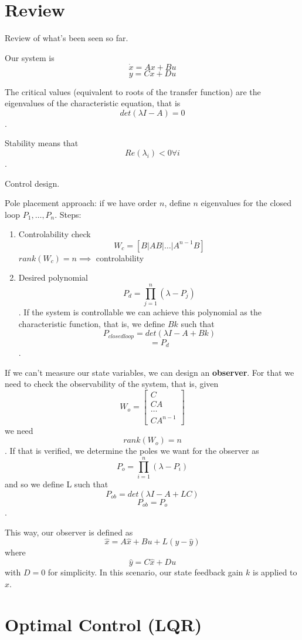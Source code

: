 
\section*{Review}

Review of what's been seen so far.

Our system is
\[
    \dot{x} = Ax + Bu
\] \[
y = Cx + Du
\] 

The critical values (equivalent to roots of the transfer function) are the eigenvalues of the characteristic equation, that is \[
    det(\lambda I-A) = 0
\] .

Stability means that \[
    Re(\lambda_i)<0 \forall i
\] .

Control design.

Pole placement approach: if we have order $n$, define $n$ eigenvalues for the closed loop $P_1, \ldots, P_n$. Steps:
\begin{enumerate}
    \item Controlability check \[
    W_c = \left[ B | AB | \ldots | A^{n-1}B \right] 
\] $rank(W_c) = n \implies $ controlability
    \item Desired polynomial \[
	    P_d = \prod_{j=1}^{n} (\lambda-P_j) 
    \] . If the system is controllable we can achieve this polynomial as the characteristic function, that is, we define $B k$ such that \[
    P_{closed loop} = det(\lambda I - A + B k)
    \] \[
    = P_d
    \] .
\end{enumerate}

If we can't measure our state variables, we can design an \textbf{observer}. For that we need to check the observability of the system, that is, given \[
    W_o = \begin{bmatrix} C \\ CA \\ \ldots \\ CA^{n-1}\end{bmatrix} 
\] we need \[
rank(W_o) = n
\] . If that is verified, we determine the poles we want for the observer as \[
P_o = \prod_{i=1}^{n} (\lambda - P_i) 
\] and so we define L such that \[
P_{ob} = det(\lambda I - A + LC)
\] \[
P_{ob} = P_o
\] .

This way, our observer is defined as \[
    \hat{x} = A \hat{x} + Bu + L(y - \hat{y})
\] where \[
\hat{y} = C \hat{x} + Du
\] with $D=0$ for simplicity. In this scenario, our state feedback gain $k$ is applied to $\hat{x}$.


\section*{Optimal Control (LQR)}

